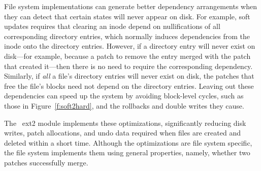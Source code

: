 File system implementations can generate better dependency arrangements
when they can detect that certain states will never appear on disk.
%
For example, soft updates requires that clearing an inode
depend on nullifications of all corresponding directory entries, which
normally induces dependencies from the inode onto the directory
entries.
%
However, if a directory entry will never exist on disk---for example,
because a patch to remove the entry merged with the patch that created
it---then there is no need to require the corresponding dependency.
%
Similarly, if \emph{all} a file's directory entries will never exist on
disk, the patches that free the file's blocks need not depend on the
directory entries.
%
Leaving out these dependencies can speed up the system by avoiding
block-level cycles, such as those in Figure~\ref{f:soft2hard}, and the
rollbacks and double writes they cause.
%
\begin{comment}
A dependency from the inode clear onto the directory entry clear is
sufficient to ensure this property. However, when a directory entry
will never exist on disk because it is created and removed before the
creation is committed, the inode clear need not depend on the
directory entry clear.
\end{comment}
%
The \Kudos\ ext2 module implements these optimizations,
%
significantly reducing disk writes, patch allocations, and undo data required
when files are created and deleted within a short time.
%
Although the optimizations are file system specific, the file system
implements them using general properties, namely, whether two patches
successfully merge.




